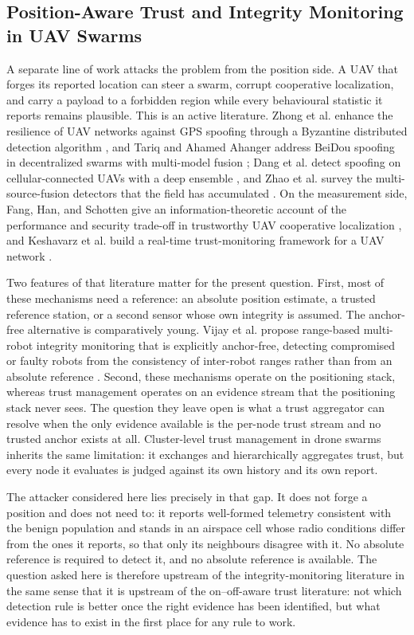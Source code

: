 \documentclass[notspecified,article,submit,moreauthors]{Definitions/mdpi}
\begin{document}
\subsection{Position-Aware Trust and Integrity Monitoring in UAV Swarms}
A separate line of work attacks the problem from the position side. A UAV that
forges its reported location can steer a swarm, corrupt cooperative
localization, and carry a payload to a forbidden region while every
behavioural statistic it reports remains plausible. This is an active
literature. Zhong et al. enhance the resilience of UAV networks against GPS
spoofing through a Byzantine distributed detection algorithm
\cite{zhong2026byzantine}, and Tariq and Ahamed Ahanger address BeiDou
spoofing in decentralized swarms with multi-model fusion
\cite{tariq2026beidou}; Dang et al. detect spoofing on cellular-connected UAVs
with a deep ensemble \cite{dang2022ensemble}, and Zhao et al. survey the
multi-source-fusion detectors that the field has accumulated
\cite{zhao2026gnssreview}. On the measurement side, Fang, Han, and Schotten
give an information-theoretic account of the performance and security
trade-off in trustworthy UAV cooperative localization \cite{fang2025trustworthy},
and Keshavarz et al. build a real-time trust-monitoring framework for a UAV
network \cite{keshavarz2020trustmonitor}.

Two features of that literature matter for the present question. First, most of
these mechanisms need a reference: an absolute position estimate, a trusted
reference station, or a second sensor whose own integrity is assumed. The
anchor-free alternative is comparatively young. Vijay et al. propose
range-based multi-robot integrity monitoring that is explicitly anchor-free,
detecting compromised or faulty robots from the consistency of inter-robot
ranges rather than from an absolute reference \cite{vijay2025anchorfree}.
Second, these mechanisms operate on the positioning stack, whereas trust
management operates on an evidence stream that the positioning stack never
sees. The question they leave open is what a trust aggregator can resolve when
the only evidence available is the per-node trust stream and no trusted anchor
exists at all. Cluster-level trust management in drone swarms
\cite{zuo2023blockchain} inherits the same limitation: it exchanges and
hierarchically aggregates trust, but every node it evaluates is judged against
its own history and its own report.

The attacker considered here lies precisely in that gap. It does not forge a
position and does not need to: it reports well-formed telemetry consistent
with the benign population and stands in an airspace cell whose radio
conditions differ from the ones it reports, so that only its neighbours
disagree with it. No absolute reference is required to detect it, and no
absolute reference is available. The question asked here is therefore upstream
of the integrity-monitoring literature in the same sense that it is upstream of
the on--off-aware trust literature: not which detection rule is better once the
right evidence has been identified, but what evidence has to exist in the first
place for any rule to work.
\end{document}
